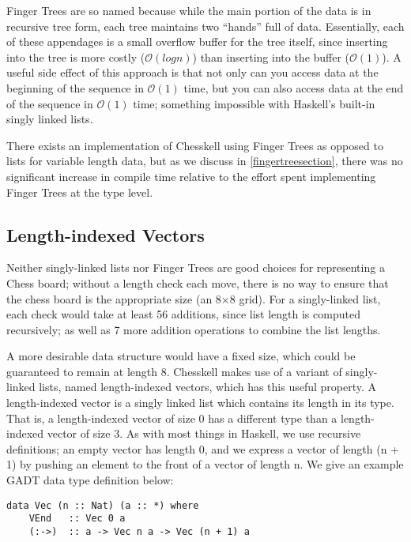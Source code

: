 Finger Trees are so named because while the main portion of the data is in recursive tree form, each tree maintains two ``hands'' full of data. Essentially, each of these appendages is a small overflow buffer for the tree itself, since inserting into the tree is more costly ($\mathcal{O}(log n)$) than inserting into the buffer ($\mathcal{O}(1)$). A useful side effect of this approach is that not only can you access data at the beginning of the sequence in $\mathcal{O}(1)$ time, but you can also access data at the end of the sequence in $\mathcal{O}(1)$ time; something impossible with Haskell's built-in singly linked lists.

There exists an implementation of Chesskell using Finger Trees as opposed to lists for variable length data, but as we discuss in \cref{fingertreesection}, there was no significant increase in compile time relative to the effort spent implementing Finger Trees at the type level.

\subsection{Length-indexed Vectors} \label{lengthindexedvectors}

Neither singly-linked lists nor Finger Trees are good choices for representing a Chess board; without a length check each move, there is no way to ensure that the chess board is the appropriate size (an 8×8 grid). For a singly-linked list, each check would take at least 56 additions, since list length is computed recursively; as well as 7 more addition operations to combine the list lengths.

A more desirable data structure would have a fixed size, which could be guaranteed to remain at length 8. Chesskell makes use of a variant of singly-linked lists, named length-indexed vectors, which has this useful property. A length-indexed vector is a singly linked list which contains its length in its type. That is, a length-indexed vector of size 0 has a different type than a length-indexed vector of size 3. As with most things in Haskell, we use recursive definitions; an empty vector has length 0, and we express a vector of length (n + 1) by pushing an element to the front of a vector of length n. We give an example GADT data type definition below:

\begin{lstlisting}
data Vec (n :: Nat) (a :: *) where
    VEnd   :: Vec 0 a
    (:->)  :: a -> Vec n a -> Vec (n + 1) a
\end{lstlisting}

